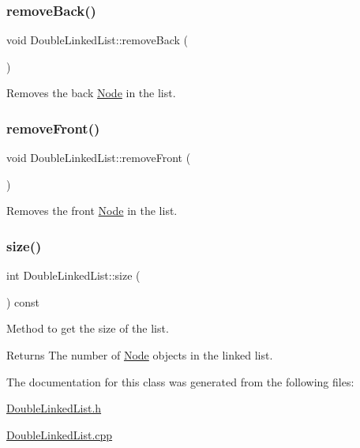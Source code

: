 \subsubsection{\texorpdfstring{remove\+Back()}{removeBack()}}
{\footnotesize\ttfamily void Double\+Linked\+List\+::remove\+Back (\begin{DoxyParamCaption}{ }\end{DoxyParamCaption})}



Removes the back \hyperlink{class_node}{Node} in the list. 

\hypertarget{class_double_linked_list_a436c04186fe23d797cae9f89eb1ae579}{}\label{class_double_linked_list_a436c04186fe23d797cae9f89eb1ae579} 
\subsubsection{\texorpdfstring{remove\+Front()}{removeFront()}}
{\footnotesize\ttfamily void Double\+Linked\+List\+::remove\+Front (\begin{DoxyParamCaption}{ }\end{DoxyParamCaption})}



Removes the front \hyperlink{class_node}{Node} in the list. 

\hypertarget{class_double_linked_list_afc6ea2333d56b8d011b32a982b52986e}{}\label{class_double_linked_list_afc6ea2333d56b8d011b32a982b52986e} 
\subsubsection{\texorpdfstring{size()}{size()}}
{\footnotesize\ttfamily int Double\+Linked\+List\+::size (\begin{DoxyParamCaption}{ }\end{DoxyParamCaption}) const}



Method to get the size of the list. 

\begin{DoxyReturn}{Returns}
The number of \hyperlink{class_node}{Node} objects in the linked list. 
\end{DoxyReturn}


The documentation for this class was generated from the following files\+:\begin{DoxyCompactItemize}
\item 
\hyperlink{_double_linked_list_8h}{Double\+Linked\+List.\+h}\item 
\hyperlink{_double_linked_list_8cpp}{Double\+Linked\+List.\+cpp}\end{DoxyCompactItemize}
